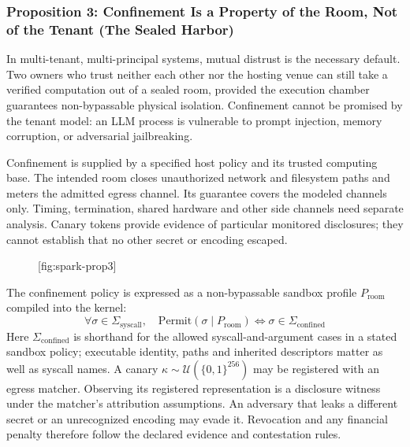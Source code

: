 \documentclass[11pt,a4paper]{article}
\providecommand{\pdchapref}[2]{\textbf{#2}}
\begin{document}
\subsubsection*{Proposition 3: Confinement Is a Property of the Room, Not of the Tenant (\pdchapref{sealed}{The Sealed Harbor})}
In multi-tenant, multi-principal systems, mutual distrust is the necessary default. Two owners who trust neither each other nor the hosting venue can still take a verified computation out of a sealed room, provided the execution chamber guarantees non-bypassable physical isolation. Confinement cannot be promised by the tenant model: an LLM process is vulnerable to prompt injection, memory corruption, or adversarial jailbreaking.

Confinement is supplied by a specified host policy and its trusted computing base. The intended room closes unauthorized network and filesystem paths and meters the admitted egress channel. Its guarantee covers the modeled channels only. Timing, termination, shared hardware and other side channels need separate analysis. Canary tokens provide evidence of particular monitored disclosures; they cannot establish that no other secret or encoding escaped.

\begin{figure}[tp]
  \centering
  [fig:spark-prop3]
\end{figure}

The confinement policy is expressed as a non-bypassable sandbox profile $P_{\text{room}}$ compiled into the kernel:
\begin{equation}
\forall \sigma \in \Sigma_{\text{syscall}}, \quad \mathrm{Permit}(\sigma \mid P_{\text{room}}) \iff \sigma \in \Sigma_{\text{confined}}
\end{equation}
Here $\Sigma_{\text{confined}}$ is shorthand for the allowed syscall-and-argument cases in a stated sandbox policy; executable identity, paths and inherited descriptors matter as well as syscall names. A canary $\kappa\sim\mathcal{U}(\{0,1\}^{256})$ may be registered with an egress matcher. Observing its registered representation is a disclosure witness under the matcher's attribution assumptions. An adversary that leaks a different secret or an unrecognized encoding may evade it. Revocation and any financial penalty therefore follow the declared evidence and contestation rules.
\end{document}
